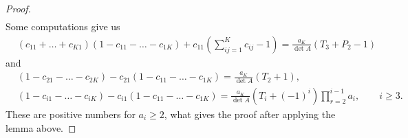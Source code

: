 \documentclass[10pt,a4paper]{article}
\numberwithin{equation}{section}
\begin{document}
\begin{proof}
\begin{align*}
 \end{align*}
 Some computations give us
 \begin{align*}
 & (c_{11}+\dots + c_{K1}) (1 - c_{11} - \dots - c_{1K}) + c_{11} \left( \sum_{ij=1}^K c_{ij} -1\right) = \frac{a_K}{\det A} (T_3 + P_2 -1)
 \end{align*}
 and
 \begin{align*}
 &(1 - c_{21} - \dots - c_{2K}) - c_{21} (1 - c_{11} - \dots - c_{1K}) = \frac{a_K}{\det A} (T_2 + 1),
 \\
 &(1 - c_{i1} - \dots - c_{iK}) - c_{i1} (1 - c_{11} - \dots - c_{1K}) = \frac{a_K}{\det A} \left(T_i + (-1)^i\right) \prod_{r=2}^{i-1} a_i, \qquad i \ge 3.
 \end{align*}
 These are positive numbers for $a_i \ge 2$, what gives the proof after applying the lemma above.
\end{proof}
\end{document}
